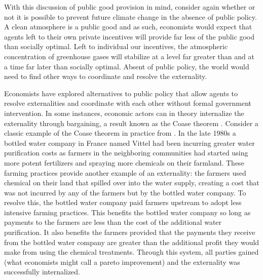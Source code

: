 With this discussion of public good provision in mind, consider again whether or not it is possible to prevent future climate change in the absence of public policy. A clean atmosphere is a public good and as such, economists would expect that agents left to their own private incentives will provide far less of the public good than socially optimal. Left to individual our incentives, the atmospheric concentration of greenhouse gases will stabilize at a level far greater than and at a time far later than socially optimal. Absent of public policy, the world would need to find other ways to coordinate and resolve the externality.

Economists have explored alternatives to public policy that allow agents to resolve externalities and coordinate with each other without formal government intervention. In some instances, economic actors can in theory internalize the externality through bargaining, a result known as the Coase theorem \citep{coase1960problem}. Consider a classic example of the Coase theorem in practice from \cite{keohane2016markets}. In the late 1980s a bottled water company in France named Vittel had been incurring greater water purification costs as farmers in the neighboring communities had started using more potent fertilizers and spraying more chemicals on their farmland. These farming practices provide another example of an externality: the farmers used chemical on their land that spilled over into the water supply, creating a cost that was not incurred by any of the farmers but by the bottled water company. To resolve this, the bottled water company paid farmers upstream to adopt less intensive farming practices. This benefits the bottled water company so long as payments to the farmers are less than the cost of the additional water purification. It also benefits the farmers provided that the payments they receive from the bottled water company are greater than the additional profit they would make from using the chemical treatments. Through this system, all parties gained (what economists might call a pareto improvement) and the externality was successfully internalized. 

